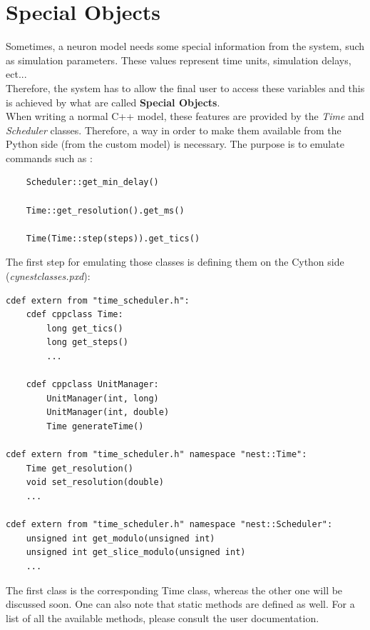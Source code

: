 \documentclass{article}
\begin{document}
\section{Special Objects}
Sometimes, a neuron model needs some special information from the system, such as simulation parameters. These values represent time units, simulation delays, ect...\\
Therefore, the system has to allow the final user to access these variables and this is achieved by what are called \textbf{Special Objects}. \\
When writing a normal C++ model, these features are provided by the \emph{Time} and \emph{Scheduler} classes. Therefore, a way in order to make them available from the Python side (from the custom model) is necessary. The purpose is to emulate commands such as :
\begin{verbatim}
    Scheduler::get_min_delay()

    Time::get_resolution().get_ms()

    Time(Time::step(steps)).get_tics()
\end{verbatim}
The first step for emulating those classes is defining them on the Cython side (\emph{cynest\/classes.pxd}):
\begin{verbatim}
cdef extern from "time_scheduler.h":
    cdef cppclass Time:
        long get_tics()
        long get_steps()
        ...

    cdef cppclass UnitManager:
        UnitManager(int, long)
        UnitManager(int, double)
        Time generateTime()

cdef extern from "time_scheduler.h" namespace "nest::Time":
    Time get_resolution()
    void set_resolution(double)
    ...
    
cdef extern from "time_scheduler.h" namespace "nest::Scheduler":
    unsigned int get_modulo(unsigned int)
    unsigned int get_slice_modulo(unsigned int)
    ...
\end{verbatim}
The first class is the corresponding Time class, whereas the other one will be discussed soon. One can also note that static methods are defined as well. For a list of all the available methods, please consult the user documentation. \\ \\
\end{document}
